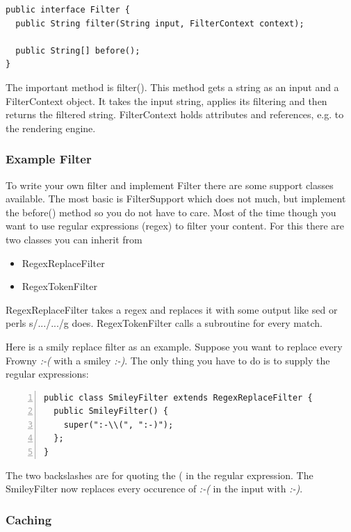 \documentclass[a4paper,pdftex]{article}
\begin{document}
\begin{verbatim}
public interface Filter {
  public String filter(String input, FilterContext context);

  public String[] before();
}
\end{verbatim}

The important method is filter(). This method gets a string as an input and a FilterContext object. It takes the input string, 
applies its filtering and then returns the filtered string. FilterContext holds attributes and references, e.g. to the rendering engine.

\subsubsection{Example Filter}

To write your own filter and implement Filter there are some support classes available. The most basic is FilterSupport 
which does not much, but implement the before() method so you do not have to care. 
Most of the time though you want to use regular expressions (regex) to filter your content. 
For this there are two classes you can inherit from 

\begin{itemize}
\item RegexReplaceFilter
\item RegexTokenFilter
\end{itemize}

RegexReplaceFilter takes a regex and replaces it with some output like sed or perls s/.../.../g does. 
RegexTokenFilter calls a subroutine for every match. 

Here is a smily replace filter as an example. Suppose you want to replace every Frowny {\it :-(} with a smiley {\it :-)}. 
The only thing you have to do is to supply the regular expressions:

\begin{Verbatim}[gobble=0,frame=single,numbers=left,fontsize=\small]
public class SmileyFilter extends RegexReplaceFilter {
  public SmileyFilter() {
    super(":-\\(", ":-)");
  };
}
\end{Verbatim}

The two backslashes are for quoting the ( in the regular expression. The SmileyFilter now
replaces every occurence of \textit{:-(} in the input with \textit{:-)}. 

\subsubsection{Caching}
\end{document}
